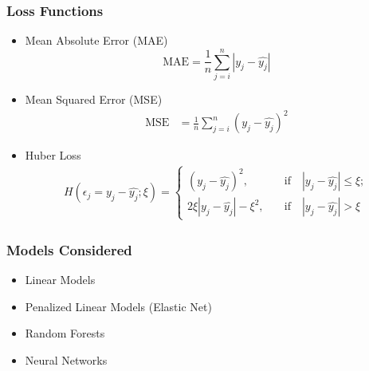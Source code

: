 \documentclass[]{beamer}
\begin{document}
\begin{frame}
\frametitle{Loss Functions}
\begin{itemize}
	\item Mean Absolute Error (MAE)
		\begin{equation}
		\text{MAE} = \frac{1}{n} \sum_{j = i}^{n} |y_j - \hat{y_j}|
		\end{equation}
	\item Mean Squared Error (MSE)
		\begin{align}
		\text{MSE} &= \frac{1}{n} \sum_{j = i}^{n} \left( y_j - \hat{y_j}\right) ^2
		\end{align}
	\item Huber Loss
		\begin{align}
		H(\epsilon_j = y_j - \hat{y_j};\xi) = 
		\begin{cases}
		\left( y_j - \hat{y_j}\right) ^2, 
		\quad &\text{if} \quad |y_j - \hat{y_j}| \leq \xi ; \\
		2 \xi  |y_j - \hat{y_j}| - \xi^2, 
		\quad &\text{if} \quad |y_j - \hat{y_j}| > \xi
		\end{cases}
		\end{align}
\end{itemize}
\end{frame}


\begin{frame}
\frametitle{Models Considered}
\begin{itemize}
	\item Linear Models
	\item Penalized Linear Models (Elastic Net)
	\item Random Forests
	\item Neural Networks
\end{itemize}
\end{frame}
\end{document}
